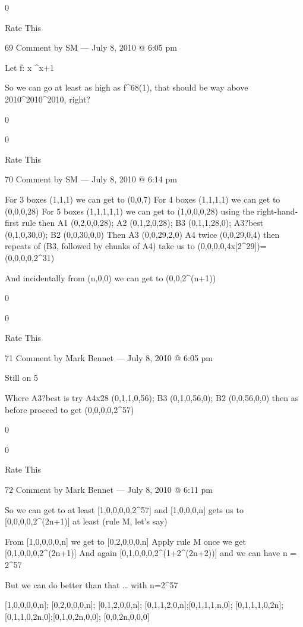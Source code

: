         0
         
        Rate This

        69 Comment by SM — July 8, 2010 @ 6:05 pm

        Let f: x ^{x+1}

        So we can go at least as high as f^{68}(1), that should be way above 2010^{2010^{2010}}, right?
         
        0
         
        0
         
        Rate This

        70 Comment by SM — July 8, 2010 @ 6:14 pm

    For 3 boxes (1,1,1) we can get to (0,0,7)
    For 4 boxes (1,1,1,1) we can get to (0,0,0,28)
    For 5 boxes (1,1,1,1,1) we can get to (1,0,0,0,28) using the right-hand-first rule
    then A1 (0,2,0,0,28); A2 (0,1,2,0,28); B3 (0,1,1,28,0); A3?best (0,1,0,30,0); B2 (0,0,30,0,0)
    Then A3 (0,0,29,2,0) A4 twice (0,0,29,0,4)
    then repeats of (B3, followed by chunks of A4) take us to (0,0,0,0,4x[2^29])=(0,0,0,0,2^31)

    And incidentally from (n,0,0) we can get to (0,0,2^(n+1))
     
    0
     
    0
     
    Rate This

    71 Comment by Mark Bennet — July 8, 2010 @ 6:05 pm

        Still on 5

        Where A3?best is try A4x28 (0,1,1,0,56); B3 (0,1,0,56,0); B2 (0,0,56,0,0)
        then as before proceed to get (0,0,0,0,2^57)
         
        0
         
        0
         
        Rate This

        72 Comment by Mark Bennet — July 8, 2010 @ 6:11 pm

            So we can get to at least [1,0,0,0,0,2^57]
            and [1,0,0,0,n] gets us to [0,0,0,0,2^(2n+1)] at least (rule M, let’s say)

            From [1,0,0,0,0,n] we get to [0,2,0,0,0,n]
            Apply rule M once we get [0,1,0,0,0,2^(2n+1)]
            And again [0,1,0,0,0,2^(1+2^(2n+2))] and we can have n = 2^57

            But we can do better than that … with n=2^57

            [1,0,0,0,0,n]; [0,2,0,0,0,n]; [0,1,2,0,0,n]; [0,1,1,2,0,n];[0,1,1,1,n,0]; [0,1,1,1,0,2n];[0,1,1,0,2n,0];[0,1,0,2n,0,0];
            [0,0,2n,0,0,0]

